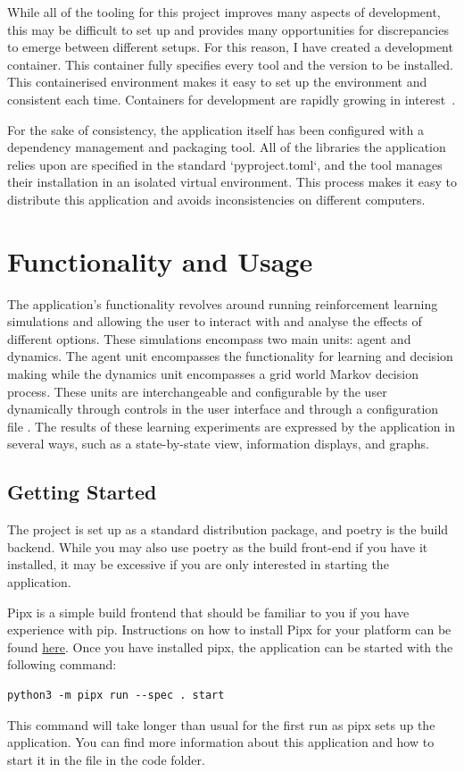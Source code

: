 \documentclass[]{final_report}
\begin{document}
While all of the tooling for this project improves many aspects of development, this may be difficult to set up and provides many opportunities for discrepancies to emerge between different setups. For this reason, I have created a development container. This container fully specifies every tool and the version to be installed. This containerised environment makes it easy to set up the environment and consistent each time. Containers for development are rapidly growing in interest~\cite{developmentContainers}. 

For the sake of consistency, the application itself has been configured with a dependency management and packaging tool. All of the libraries the application relies upon are specified in the standard `pyproject.toml`, and the tool manages their installation in an isolated virtual environment. This process makes it easy to distribute this application and avoids inconsistencies on different computers.

\newpage
\section{Functionality and Usage}

The application's functionality revolves around running reinforcement learning simulations and allowing the user to interact with and analyse the effects of different options. These simulations encompass two main units: agent and dynamics. The agent unit encompasses the functionality for learning and decision making while the dynamics unit encompasses a grid world Markov decision process. These units are interchangeable and configurable by the user dynamically through controls in the user interface and through a configuration file . The results of these learning experiments are expressed by the application in several ways, such as a state-by-state view, information displays, and graphs.


\subsection{Getting Started}

The project is set up as a standard distribution package, and poetry is the build backend. While you may also use poetry as the build front-end if you have it installed, it may be excessive if you are only interested in starting the application.

Pipx is a simple build frontend that should be familiar to you if you have experience with pip. Instructions on how to install Pipx for your platform can be found \href{https://pipx.pypa.io/stable/installation/}{here}. Once you have installed pipx, the application can be started with the following command:
\begin{verbatim}
python3 -m pipx run --spec . start
\end{verbatim}
This command will take longer than usual for the first run as pipx sets up the application. You can find more information about this application and how to start it in the  file in the code folder.
\end{document}
